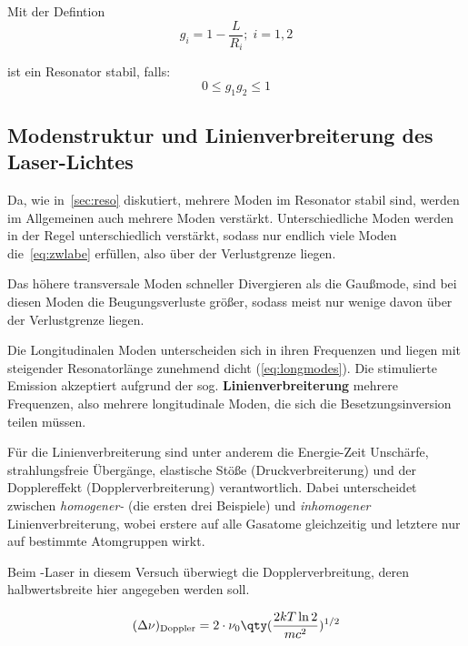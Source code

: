 \documentclass[slug=GL, room=HZDR\ Dresden/Rossendorf\,\ Geb.\ 620/123, supervisor=Martin\ Rehwald;\, Tim\ Ziegler]{../../Lab_Report_LaTeX/lab_report}
\newcommand{\hne}{\ce{HeNe}-Laser}
\begin{document}
Mit der Defintion
\begin{equation}
  \label{eq:gparams}
  g_i=1-\frac{L}{R_i};\; i=1,2
\end{equation}

ist ein Resonator stabil, falls:
\begin{equation}
  \label{eq:stabbed}
  0\leq g_1g_2\leq 1
\end{equation}

\subsection{Modenstruktur und Linienverbreiterung des Laser-Lichtes}
\label{ref:linv}

Da, wie in~\ref{sec:reso} diskutiert, mehrere Moden im Resonator
stabil sind, werden im Allgemeinen auch mehrere Moden verst\"arkt.
Unterschiedliche Moden werden in der Regel unterschiedlich
verst\"arkt, sodass nur endlich viele Moden die~\ref{eq:zwlabe}
erf\"ullen, also \"uber der Verlustgrenze liegen.

Das h\"ohere transversale Moden schneller Divergieren als die
Gau\ss{}mode, sind bei diesen Moden die Beugungsverluste gr\"o\ss{}er,
sodass meist nur wenige davon \"uber der Verlustgrenze liegen. 

Die Longitudinalen Moden unterscheiden sich in ihren Frequenzen und
liegen mit steigender Resonatorl\"ange zunehmend dicht
(\ref{eq:longmodes}). Die stimulierte Emission akzeptiert aufgrund der
sog. \textbf{Linienverbreiterung} mehrere Frequenzen, also mehrere
longitudinale Moden, die sich die Besetzungsinversion teilen m\"ussen.

F\"ur die Linienverbreiterung sind unter anderem die Energie-Zeit
Unsch\"arfe, strahlungsfreie \"Uberg\"ange, elastische St\"o\ss{}e
(Druckverbreiterung) und der Dopplereffekt (Dopplerverbreiterung)
verantwortlich. Dabei unterscheidet zwischen \textit{homogener-} (die
ersten drei Beispiele) und \textit{inhomogener} Linienverbreiterung,
wobei erstere auf alle Gasatome gleichzeitig und letztere nur auf
bestimmte Atomgruppen wirkt. 

Beim \hne{} in diesem Versuch \"uberwiegt die Dopplerverbreitung,
deren halbwertsbreite hier angegeben werden soll.

\begin{equation}
  \label{eq:doppler}
  (\Delta\nu)_{\text{Doppler}}=2\cdot \nu_0\qty(\frac{2kT\ln{2}}{mc^2})^{1/2}
\end{equation}
\end{document}
